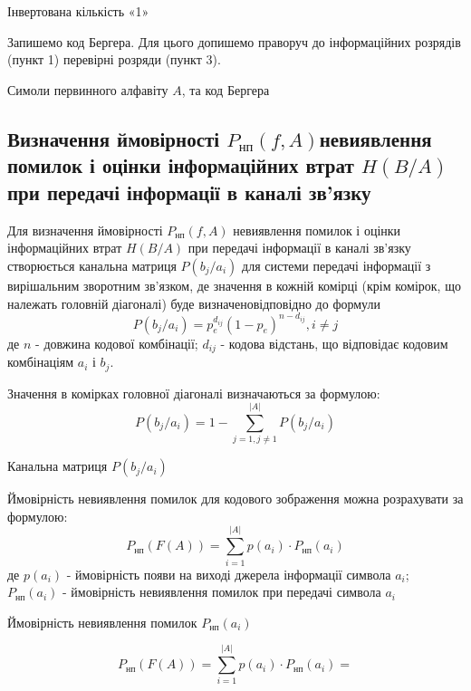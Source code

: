 \documentclass[a4paper,14pt]{extreport}
\begin{document}
\begin{table}[H]
	\caption{Інвертована кількість «1» }
	\centering
	
	\label{table:codewords-control_bits_inverterd}
\end{table}
Запишемо код Бергера.
Для цього допишемо праворуч до інформаційних
розрядів (пункт 1) перевірні розряди (пункт 3).

\begin{table}[H]
	\caption{Симоли первинного алфавіту $A$, та код Бергера}
	\centering
	
	\label{table:berger-code}
\end{table}

\subsection{Визначення ймовірності $P_{\text{нп}} (f,A)$невиявлення помилок і оцінки інформаційних втрат $H(B/A)$ при передачі	інформації в каналі зв'язку}

Для визначення ймовірності $P_{\text{нп}} (f,A)$
невиявлення помилок і оцінки інформаційних втрат $H(B/A)$ при передачі інформації в каналі зв'язку створюється канальна матриця $P(b_j/a_i)$  для системи передачі інформації з вирішальним зворотним зв'язком, де значення в кожній комірці (крім комірок, що належать головній діагоналі) буде визначеновідповідно до формули
$$P(b_j/a_i) = p_e^{d_{ij}}(1-p_e)^{n-d_{ij}}, i \neq j$$
де $n$ - довжина кодової комбінації;
$d_{ij}$ - кодова відстань, що відповідає кодовим комбінаціям $a_i$ і $b_j$.

Значення в комірках головної діагоналі визначаються за формулою:
$$P(b_j/a_i) = 1- \sum_{j=1,j \neq 1}^{|A|} P(b_j/a_i) $$


\begin{table}[H]
	\caption{Канальна матриця $P( b_j / a_i )$}
	\centering
	\resizebox{\columnwidth}{!}{%
	
}
	\label{table:channel_matrix_p_bj_ai}
\end{table}

Ймовірність невиявлення помилок для кодового зображення можна розрахувати за формулою:
$$P_{\text{нп}}(F(A))= \sum_{i=1}^{|A|}p(a_i) \cdot P_{\text{нп}}(a_i)$$ 
де $p(a_i) $ - ймовірність появи на виході джерела інформації символа $a_i$;
$P_{\text{нп}}(a_i)$ - ймовірність невиявлення помилок при передачі символа $a_i$

\begin{table}[H]
	\caption{Ймовірність невиявлення помилок $P_{\text{нп}}(a_i)$}
	\centering	
			
	\label{table:errors_probability}
\end{table}
$$P_{\text{нп}}(F(A))= \sum_{i=1}^{|A|}p(a_i) \cdot P_{\text{нп}}(a_i) = $$ 
\end{document}
